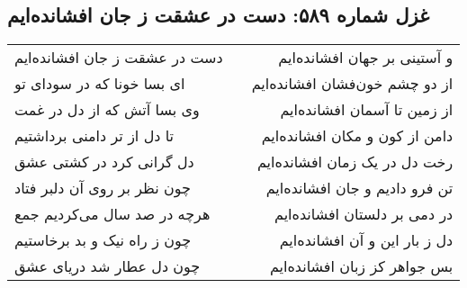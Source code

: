 \begin{center}
\section*{غزل شماره ۵۸۹: دست در عشقت ز جان افشانده‌ایم}
\label{sec:589}
\begin{longtable}{l p{0.5cm} r}
دست در عشقت ز جان افشانده‌ایم
&&
و آستینی بر جهان افشانده‌ایم
\\
ای بسا خونا که در سودای تو
&&
از دو چشم خون‌فشان افشانده‌ایم
\\
وی بسا آتش که از دل در غمت
&&
از زمین تا آسمان افشانده‌ایم
\\
تا دل از تر دامنی برداشتیم
&&
دامن از کون و مکان افشانده‌ایم
\\
دل گرانی کرد در کشتی عشق
&&
رخت دل در یک زمان افشانده‌ایم
\\
چون نظر بر روی آن دلبر فتاد
&&
تن فرو دادیم و جان افشانده‌ایم
\\
هرچه در صد سال می‌کردیم جمع
&&
در دمی بر دلستان افشانده‌ایم
\\
چون ز راه نیک و بد برخاستیم
&&
دل ز بار این و آن افشانده‌ایم
\\
چون دل عطار شد دریای عشق
&&
بس جواهر کز زبان افشانده‌ایم
\\
\end{longtable}
\end{center}
